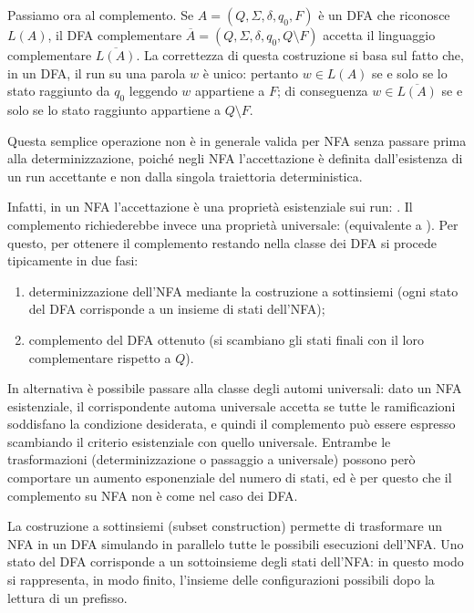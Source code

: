 Passiamo ora al complemento. Se \(A=(Q,\Sigma,\delta,q_0,F)\) è un DFA che riconosce \(L(A)\), il DFA complementare \(\overline{A}=(Q,\Sigma,\delta,q_0,Q\setminus F)\) accetta il linguaggio complementare \(\overline{L(A)}\). La correttezza di questa costruzione si basa sul fatto che, in un DFA, il run su una parola \(w\) è unico: pertanto \(w\in L(A)\) se e solo se lo stato raggiunto da \(q_0\) leggendo \(w\) appartiene a \(F\); di conseguenza \(w\in\overline{L(A)}\) se e solo se lo stato raggiunto appartiene a \(Q\setminus F\).

Questa semplice operazione non è in generale valida per NFA senza passare prima alla determinizzazione, poiché negli NFA l'accettazione è definita dall'esistenza di un run accettante e non dalla singola traiettoria deterministica.

Infatti, in un NFA l'accettazione è una proprietà esistenziale sui run: . Il complemento richiederebbe invece una proprietà universale:  (equivalente a ). Per questo, per ottenere il complemento restando nella classe dei DFA si procede tipicamente in due fasi:

\begin{enumerate}
  \item determinizzazione dell'NFA mediante la costruzione a sottinsiemi (ogni stato del DFA corrisponde a un insieme di stati dell'NFA);
  \item complemento del DFA ottenuto (si scambiano gli stati finali con il loro complementare rispetto a \(Q\)).
\end{enumerate}

In alternativa è possibile passare alla classe degli automi universali: dato un NFA esistenziale, il corrispondente automa universale accetta se tutte le ramificazioni soddisfano la condizione desiderata, e quindi il complemento può essere espresso scambiando il criterio esistenziale con quello universale. Entrambe le trasformazioni (determinizzazione o passaggio a universale) possono però comportare un aumento esponenziale del numero di stati, ed è per questo che il complemento su NFA non è  come nel caso dei DFA\@.

La costruzione a sottinsiemi (subset construction) permette di trasformare un NFA in un DFA simulando in parallelo tutte le possibili esecuzioni dell'NFA\@. Uno stato del DFA corrisponde a un sottoinsieme degli stati dell'NFA\@: in questo modo si rappresenta, in modo finito, l'insieme delle configurazioni possibili dopo la lettura di un prefisso.

